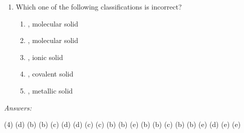 \documentclass[main.tex]{subfiles}
\begin{document}
\begin{fullwidth}
\begin{multicols*}{2}
\begin{enumerate}
		
\item Which one of the following classifications is incorrect?
\begin{enumerate}[label=(\alph*)]
\item  {}, molecular solid
\item  {}, molecular solid
\item  {}, ionic solid
\item  {}, covalent solid
\item  {}, metallic solid
 \end{enumerate} 







 


 



\end{enumerate}\end{multicols*}

\end{fullwidth}
\clearpage
\newpage
\thispagestyle{empty}
\begin{fullwidth}






\vspace{2cm}\emph{Answers:}\\
\vspace{-0.5cm}
\begin{tasks}[counter-format={tsk[1].}, label-align=left, label-offset={0mm}, label-width={5mm}, item-indent={1mm}, label-format={\bfseries}](4)
\task (d) 
\task (b) 
\task (b) 
\task (c) 
\task (d) 
\task (d) 
\task (c) 
\task (c) 
\task (b) 
\task (b) 
\task (e) 
\task (b) 
\task (b) 
\task (c) 
\task (b) 
\task (b) 
\task (e) 
\task (d) 
\task (e) 
\task (e)
\end{tasks}






\end{fullwidth}
\restoregeometry
\end{document}

